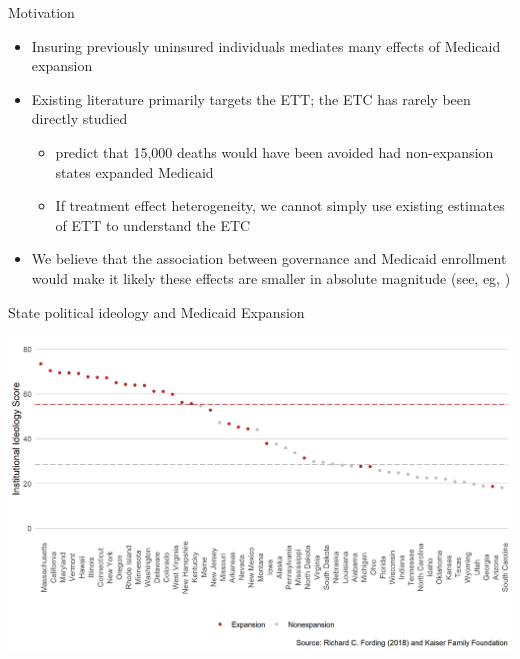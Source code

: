 \documentclass[hyperref={pdfpagelabels=false}]{beamer}
\begin{document}
\begin{frame}{Motivation}
    \begin{itemize}
    \item Insuring previously uninsured individuals mediates many effects of Medicaid expansion \bigskip
    \item Existing literature primarily targets the ETT; the ETC has rarely been directly studied \bigskip
    \begin{itemize}
        \item \cite{wherry2016early} predict that 15,000 deaths would have been avoided had non-expansion states expanded Medicaid \bigskip
        \item If treatment effect heterogeneity, we cannot simply use existing estimates of ETT to understand the ETC \bigskip
    \end{itemize}
    \item We believe that the association between governance and Medicaid enrollment would make it likely these effects are smaller in absolute magnitude (see, eg, \cite{daw2018matching}) \bigskip
    \end{itemize} 
\end{frame}

\begin{frame}{State political ideology and Medicaid Expansion}
    \begin{center}
	\includegraphics[scale=0.5]{01_Plots/political-expansion-plot.png}
    \end{center}
\end{frame}
\end{document}
